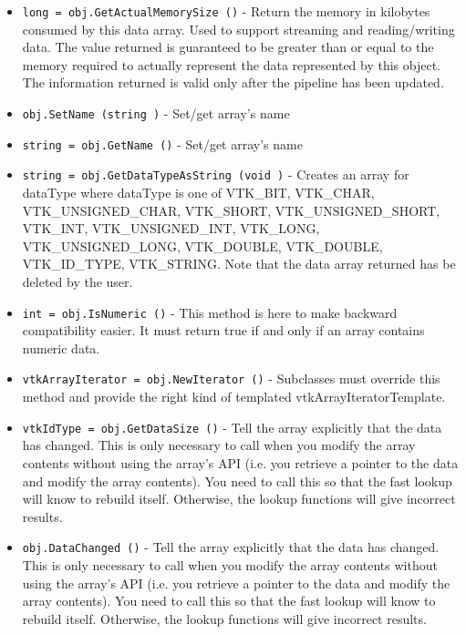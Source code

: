 \begin{itemize}
\item  \verb|long = obj.GetActualMemorySize ()| -  Return the memory in kilobytes consumed by this data array. Used to
 support streaming and reading/writing data. The value returned is
 guaranteed to be greater than or equal to the memory required to
 actually represent the data represented by this object. The 
 information returned is valid only after the pipeline has 
 been updated.

\item  \verb|obj.SetName (string )| -  Set/get array's name

\item  \verb|string = obj.GetName ()| -  Set/get array's name

\item  \verb|string = obj.GetDataTypeAsString (void )| -  Creates an array for dataType where dataType is one of
 VTK\_BIT, VTK\_CHAR, VTK\_UNSIGNED\_CHAR, VTK\_SHORT,
 VTK\_UNSIGNED\_SHORT, VTK\_INT, VTK\_UNSIGNED\_INT, VTK\_LONG,
 VTK\_UNSIGNED\_LONG, VTK\_DOUBLE, VTK\_DOUBLE, VTK\_ID\_TYPE,
 VTK\_STRING.
 Note that the data array returned has be deleted by the
 user.

\item  \verb|int = obj.IsNumeric ()| -  This method is here to make backward compatibility easier.  It
 must return true if and only if an array contains numeric data.

\item  \verb|vtkArrayIterator = obj.NewIterator ()| -  Subclasses must override this method and provide the right 
 kind of templated vtkArrayIteratorTemplate.

\item  \verb|vtkIdType = obj.GetDataSize ()| -  Tell the array explicitly that the data has changed.
 This is only necessary to call when you modify the array contents
 without using the array's API (i.e. you retrieve a pointer to the
 data and modify the array contents).  You need to call this so that
 the fast lookup will know to rebuild itself.  Otherwise, the lookup
 functions will give incorrect results.

\item  \verb|obj.DataChanged ()| -  Tell the array explicitly that the data has changed.
 This is only necessary to call when you modify the array contents
 without using the array's API (i.e. you retrieve a pointer to the
 data and modify the array contents).  You need to call this so that
 the fast lookup will know to rebuild itself.  Otherwise, the lookup
 functions will give incorrect results.


\end{itemize}
